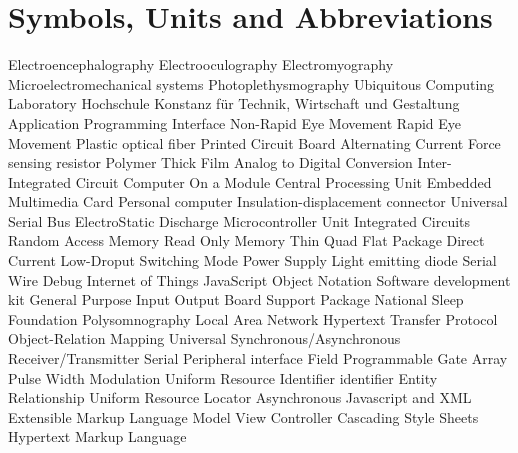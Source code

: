 \chapter*{Symbols, Units and Abbreviations}

\begin{acronym}
   {Electroencephalography}
   {Electrooculography}
   {Electromyography}
   {Microelectromechanical systems}
   {Photoplethysmography}
   {Ubiquitous Computing Laboratory}
   {Hochschule Konstanz f\"ur Technik, Wirtschaft und Gestaltung}
   {Application Programming Interface}
   {Non-Rapid Eye Movement}
   {Rapid Eye Movement}
   {Plastic optical fiber}
   {Printed Circuit Board}
   {Alternating Current}
   {Force sensing resistor}
   {Polymer Thick Film}
   {Analog to Digital Conversion}
   {Inter-Integrated Circuit}
   {Computer On a Module}
   {Central Processing Unit}
   {Embedded Multimedia Card}
   {Personal computer}
   {Insulation-displacement connector}
   {Universal Serial Bus}
   {ElectroStatic Discharge}
   {Microcontroller Unit}
   {Integrated Circuits}
   {Random Access Memory}
   {Read Only Memory}
   {Thin Quad Flat Package}
   {Direct Current}
   {Low-Droput}
   {Switching Mode Power Supply}
   {Light emitting diode}
   {Serial Wire Debug}
   {Internet of Things}
   {JavaScript Object Notation}
   {Software development kit}
   {General Purpose Input Output}
   {Board Support Package}
   {National Sleep Foundation}
   {Polysomnography}
   {Local Area Network}
   {Hypertext Transfer Protocol}
   {Object-Relation Mapping}
   {Universal Synchronous/Asynchronous Receiver/Transmitter}
   {Serial Peripheral interface}
   {Field Programmable Gate Array}
   {Pulse Width Modulation}
   {Uniform Resource Identifier}
   {identifier}
   {Entity Relationship}
   {Uniform Resource Locator}
   {Asynchronous Javascript and XML}
   {Extensible Markup Language}
   {Model View Controller}
   {Cascading Style Sheets}
   {Hypertext Markup Language}
\end{acronym}

\newpage